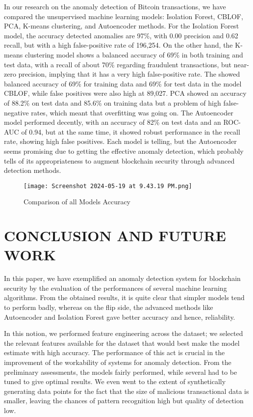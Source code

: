 \documentclass[journal]{IEEEtran}
\begin{document}
In our research on the anomaly detection of Bitcoin transactions, we have compared the unsupervised machine learning models: Isolation Forest, CBLOF, PCA, K-means clustering, and Autoencoder methods. For the Isolation Forest model, the accuracy detected anomalies are 97\%, with 0.00 precision and 0.62 recall, but with a high false-positive rate of 196,254. On the other hand, the K-means clustering model shows a balanced accuracy of 69\% in both training and test data, with a recall of about 70\% regarding fraudulent transactions, but near-zero precision, implying that it has a very high false-positive rate. The showed balanced accuracy of 69\% for training data and 69\% for test data in the model CBLOF, while false positives were also high at 89,027. PCA showed an accuracy of 88.2\% on test data and 85.6\% on training data but a problem of high false-negative rates, which meant that overfitting was going on. The Autoencoder model performed decently, with an accuracy of 82\% on test data and an ROC-AUC of 0.94, but at the same time, it showed robust performance in the recall rate, showing high false positives. Each model is telling, but the Autoencoder seems promising due to getting the effective anomaly detection, which probably tells of its appropriateness to augment blockchain security through advanced detection methods. 

\begin{figure}
    \centering
    \texttt{[image: Screenshot 2024-05-19 at 9.43.19 PM.png]}
    \caption{Comparison of all Models Accuracy}
    \label{fig:enter-label}
\end{figure}

\section{CONCLUSION AND FUTURE WORK}

In this paper, we have exemplified an anomaly detection system for blockchain security by the evaluation of the performances of several machine learning algorithms. From the obtained results, it is quite clear that simpler models tend to perform badly, whereas on the flip side, the advanced methods like Autoencoder and Isolation Forest gave better accuracy and hence, reliability. 

In this notion, we performed feature engineering across the dataset; we selected the relevant features available for the dataset that would best make the model estimate with high accuracy. The performance of this act is crucial in the improvement of the workability of systems for anomaly detection. From the preliminary assessments, the models fairly performed, while several had to be tuned to give optimal results. We even went to the extent of synthetically generating data points for the fact that the size of malicious transactional data is smaller, leaving the chances of pattern recognition high but quality of detection low. 
\end{document}
